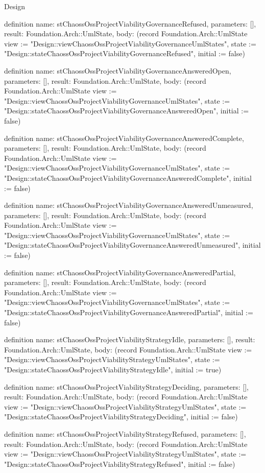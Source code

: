 \begin{lexlean}{Design}
\begin{semanticmodule}
definition{
  name: stChaossOssProjectViabilityGovernanceRefused,
  parameters: [],
  result: Foundation.Arch::UmlState,
  body: (record Foundation.Arch::UmlState {view := "Design::viewChaossOssProjectViabilityGovernanceUmlStates", state := "Design::stateChaossOssProjectViabilityGovernanceRefused", initial := false})
}

definition{
  name: stChaossOssProjectViabilityGovernanceAnsweredOpen,
  parameters: [],
  result: Foundation.Arch::UmlState,
  body: (record Foundation.Arch::UmlState {view := "Design::viewChaossOssProjectViabilityGovernanceUmlStates", state := "Design::stateChaossOssProjectViabilityGovernanceAnsweredOpen", initial := false})
}

definition{
  name: stChaossOssProjectViabilityGovernanceAnsweredComplete,
  parameters: [],
  result: Foundation.Arch::UmlState,
  body: (record Foundation.Arch::UmlState {view := "Design::viewChaossOssProjectViabilityGovernanceUmlStates", state := "Design::stateChaossOssProjectViabilityGovernanceAnsweredComplete", initial := false})
}

definition{
  name: stChaossOssProjectViabilityGovernanceAnsweredUnmeasured,
  parameters: [],
  result: Foundation.Arch::UmlState,
  body: (record Foundation.Arch::UmlState {view := "Design::viewChaossOssProjectViabilityGovernanceUmlStates", state := "Design::stateChaossOssProjectViabilityGovernanceAnsweredUnmeasured", initial := false})
}

definition{
  name: stChaossOssProjectViabilityGovernanceAnsweredPartial,
  parameters: [],
  result: Foundation.Arch::UmlState,
  body: (record Foundation.Arch::UmlState {view := "Design::viewChaossOssProjectViabilityGovernanceUmlStates", state := "Design::stateChaossOssProjectViabilityGovernanceAnsweredPartial", initial := false})
}

definition{
  name: stChaossOssProjectViabilityStrategyIdle,
  parameters: [],
  result: Foundation.Arch::UmlState,
  body: (record Foundation.Arch::UmlState {view := "Design::viewChaossOssProjectViabilityStrategyUmlStates", state := "Design::stateChaossOssProjectViabilityStrategyIdle", initial := true})
}

definition{
  name: stChaossOssProjectViabilityStrategyDeciding,
  parameters: [],
  result: Foundation.Arch::UmlState,
  body: (record Foundation.Arch::UmlState {view := "Design::viewChaossOssProjectViabilityStrategyUmlStates", state := "Design::stateChaossOssProjectViabilityStrategyDeciding", initial := false})
}

definition{
  name: stChaossOssProjectViabilityStrategyRefused,
  parameters: [],
  result: Foundation.Arch::UmlState,
  body: (record Foundation.Arch::UmlState {view := "Design::viewChaossOssProjectViabilityStrategyUmlStates", state := "Design::stateChaossOssProjectViabilityStrategyRefused", initial := false})
}


\end{semanticmodule}
\end{lexlean}
